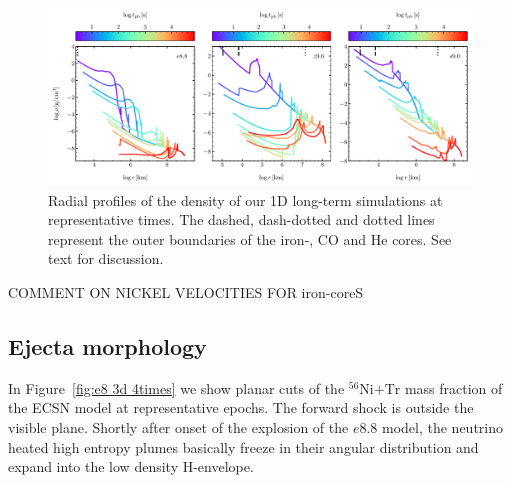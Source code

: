 \documentclass[fleqn,usenatbib]{mnras}
\newcommand{\nickel}{\ensuremath{\mathrm{^{56}Ni}}\xspace}
\newcommand{\tracer}{\ensuremath{\mathrm{Tr}}\xspace}
\newcommand{\COM}[1]{{\color{orange}#1}}
\begin{document}
\begin{figure}
 \centering
 \includegraphics[width=\textwidth, trim=0cm 0.0cm 0cm 0.0cm,clip]{pic/density_profiles_1d_long_term.pdf}
 \caption{Radial profiles of the density of our 1D long-term simulations at representative times. The dashed, dash-dotted and dotted lines represent the outer boundaries of the iron-, CO and He cores. See text for discussion.}
 \label{fig:density profiles all times}
\end{figure}

\COM{COMMENT ON NICKEL VELOCITIES FOR iron-coreS}

\subsection{Ejecta morphology}
In Figure~\ref{fig:e8 3d 4times} we show planar cuts of the $\nickel\mathord{+}\tracer$ mass fraction of the ECSN model at representative epochs. The forward shock is outside the visible plane. 
Shortly after onset of the explosion of the $e8.8$ model, the neutrino heated high entropy plumes basically freeze in their angular distribution and expand into the low density H-envelope. 
\end{document}
